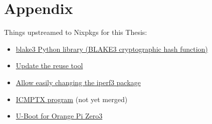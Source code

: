 
\chapter{Appendix}

Things upstreamed to Nixpkgs for this Thesis:
\begin{itemize}
  \item \href{https://github.com/NixOS/nixpkgs/pull/343277}{blake3 Python library (BLAKE3 cryptographic hash function)}
  \item \href{https://github.com/NixOS/nixpkgs/pull/281636}{Update the reuse tool}
  \item \href{https://github.com/NixOS/nixpkgs/pull/333462}{Allow easily changing the iperf3 package}
  \item \href{https://github.com/NixOS/nixpkgs/pull/357574}{ICMPTX program} (not yet merged)
  \item \href{https://github.com/NixOS/nixpkgs/pull/326845}{U-Boot for Orange Pi Zero3}
\end{itemize}

